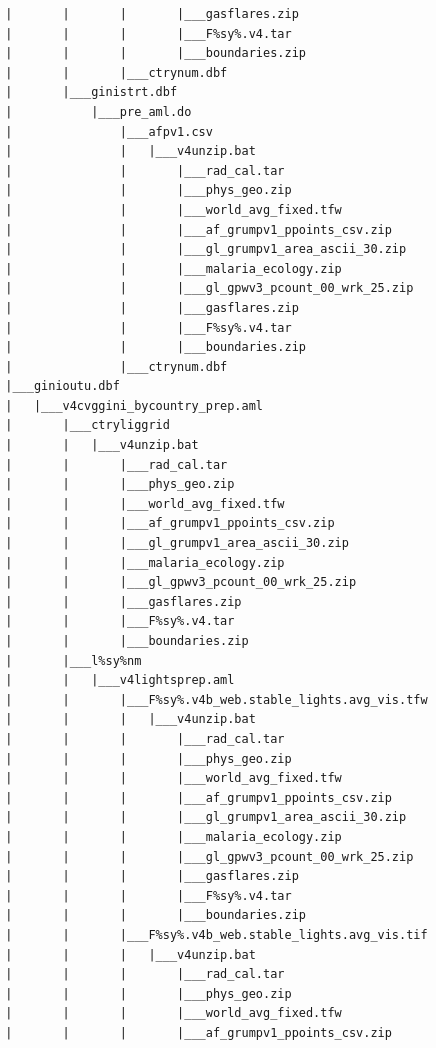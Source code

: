 \documentclass[]{book}
\begin{document}
\begin{verbatim}
        |       |       |       |___gasflares.zip
        |       |       |       |___F%sy%.v4.tar
        |       |       |       |___boundaries.zip
        |       |       |___ctrynum.dbf
        |       |___ginistrt.dbf
        |           |___pre_aml.do
        |               |___afpv1.csv
        |               |   |___v4unzip.bat
        |               |       |___rad_cal.tar
        |               |       |___phys_geo.zip
        |               |       |___world_avg_fixed.tfw
        |               |       |___af_grumpv1_ppoints_csv.zip
        |               |       |___gl_grumpv1_area_ascii_30.zip
        |               |       |___malaria_ecology.zip
        |               |       |___gl_gpwv3_pcount_00_wrk_25.zip
        |               |       |___gasflares.zip
        |               |       |___F%sy%.v4.tar
        |               |       |___boundaries.zip
        |               |___ctrynum.dbf
        |___ginioutu.dbf
        |   |___v4cvggini_bycountry_prep.aml
        |       |___ctryliggrid
        |       |   |___v4unzip.bat
        |       |       |___rad_cal.tar
        |       |       |___phys_geo.zip
        |       |       |___world_avg_fixed.tfw
        |       |       |___af_grumpv1_ppoints_csv.zip
        |       |       |___gl_grumpv1_area_ascii_30.zip
        |       |       |___malaria_ecology.zip
        |       |       |___gl_gpwv3_pcount_00_wrk_25.zip
        |       |       |___gasflares.zip
        |       |       |___F%sy%.v4.tar
        |       |       |___boundaries.zip
        |       |___l%sy%nm
        |       |   |___v4lightsprep.aml
        |       |       |___F%sy%.v4b_web.stable_lights.avg_vis.tfw
        |       |       |   |___v4unzip.bat
        |       |       |       |___rad_cal.tar
        |       |       |       |___phys_geo.zip
        |       |       |       |___world_avg_fixed.tfw
        |       |       |       |___af_grumpv1_ppoints_csv.zip
        |       |       |       |___gl_grumpv1_area_ascii_30.zip
        |       |       |       |___malaria_ecology.zip
        |       |       |       |___gl_gpwv3_pcount_00_wrk_25.zip
        |       |       |       |___gasflares.zip
        |       |       |       |___F%sy%.v4.tar
        |       |       |       |___boundaries.zip
        |       |       |___F%sy%.v4b_web.stable_lights.avg_vis.tif
        |       |       |   |___v4unzip.bat
        |       |       |       |___rad_cal.tar
        |       |       |       |___phys_geo.zip
        |       |       |       |___world_avg_fixed.tfw
        |       |       |       |___af_grumpv1_ppoints_csv.zip

\end{verbatim}
\end{document}
